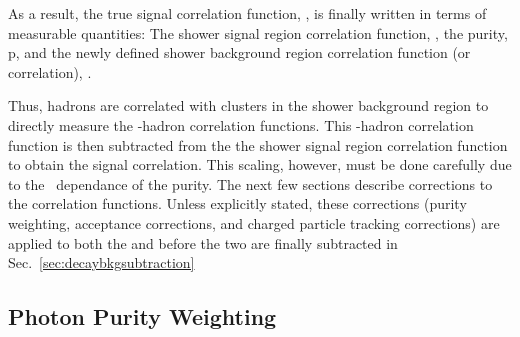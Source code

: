As a result, the true signal correlation function, \CS, is finally written in terms of measurable quantities: The shower signal region correlation function, \CSR, the purity, p, and the newly defined shower background region correlation function (or \ydecay correlation), \CBR.

Thus, hadrons are correlated with clusters in the shower background region to directly measure the \ydecay-hadron correlation functions. This \ydecay-hadron correlation function is then subtracted from the the shower signal region correlation function to obtain the signal correlation. This scaling, however, must be done carefully due to the \pt~dependance of the purity. The next few sections describe corrections to the correlation functions. Unless explicitly stated, these corrections (purity weighting, acceptance corrections, and charged particle tracking corrections) are applied to both the \CSR and \CBR before the two are finally subtracted in Sec.~\ref{sec:decaybkgsubtraction}


       





\subsection{Photon Purity Weighting}

